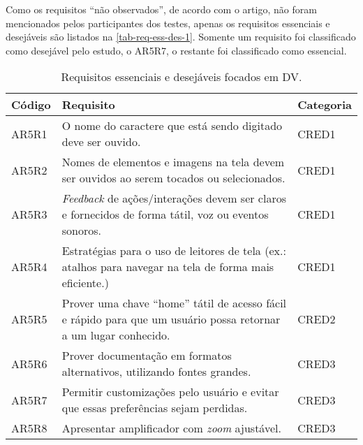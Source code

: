 Como os requisitos ``não observados'', de acordo com o artigo, não foram mencionados pelos participantes dos testes, apenas
os requisitos essenciais e desejáveis são listados na \autoref{tab-req-ess-des-1}.
Somente um requisito foi classificado como desejável pelo estudo, o AR5R7, o restante foi classificado como essencial.

\begin{table}[htb]
  \begin{center}
    \ABNTEXfontereduzida
    \caption{Requisitos essenciais e desejáveis focados em DV.}
    \label{tab-req-ess-des-1}
    \begin{tabular}{p{1.2cm}|p{12.1cm}|p{1.4cm}}
      \textbf{Código} & \textbf{Requisito}                                                                                               & \textbf{Categoria} \\
      \hline
      AR5R1           & O nome do caractere que está sendo digitado deve ser ouvido.                                                      & CRED1              \\
      \hline
      AR5R2           & Nomes de elementos e imagens na tela devem ser ouvidos ao serem tocados ou selecionados.                          & CRED1              \\
      \hline
      AR5R3           & \emph{Feedback} de ações/interações devem ser claros e fornecidos de forma tátil, voz ou eventos sonoros.         & CRED1              \\
      \hline
      AR5R4           & Estratégias para o uso de leitores de tela (ex.\@: atalhos para navegar na tela de forma mais eficiente.)         & CRED1              \\
      \hline
      AR5R5           & Prover uma chave ``home'' tátil de acesso fácil e rápido para que um usuário possa retornar a um lugar conhecido. & CRED2              \\
      \hline
      AR5R6           & Prover documentação em formatos alternativos, utilizando fontes grandes.                                          & CRED3              \\
      \hline
      AR5R7           & Permitir customizações pelo usuário e evitar que essas preferências sejam perdidas.                               & CRED3              \\
      \hline
      AR5R8           & Apresentar amplificador com \emph{zoom} ajustável.                                                                & CRED3              \\

\end{tabular}
\end{center}
\end{table}
